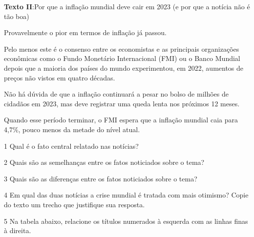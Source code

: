 {\begin{myquote}

\textbf{Texto II}:Por que a inflação mundial deve cair em 2023 (e por que a
notícia não é tão boa)

Provavelmente o pior em termos de inflação já passou.

Pelo menos este é o consenso entre os economistas e as principais
organizações econômicas como o Fundo Monetário Internacional (FMI) ou o
Banco Mundial depois que a maioria dos países do mundo experimentou, em
2022, aumentos de preços não vistos em quatro décadas.

Não há dúvida de que a inflação continuará a pesar no bolso de milhões
de cidadãos em 2023, mas deve registrar uma queda lenta nos próximos 12
meses.

Quando esse período terminar, o FMI espera que a inflação mundial caia
para 4,7\%, pouco menos da metade do nível atual. 

\end{myquote}


\num{1} Qual é o fato central relatado nas notícias?


\num{2} Quais são as semelhanças entre os fatos noticiados sobre o tema?


\num{3} Quais são as diferenças entre os fatos noticiados sobre o tema?


\num{4} Em qual das duas notícias a crise mundial é tratada com mais otimismo?
Copie do texto um trecho que justifique sua resposta.


\num{5} Na tabela abaixo, relacione os títulos numerados à esquerda
com as linhas finas à direita.

}

